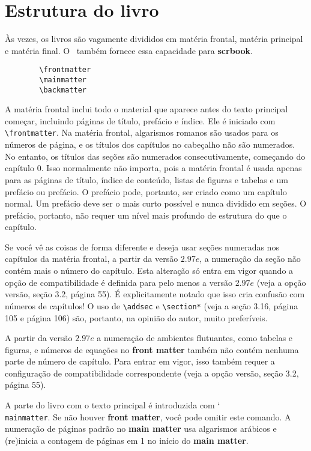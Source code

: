\chapter{Estrutura do livro}
Às vezes, os livros são vagamente divididos em matéria frontal, matéria principal e matéria final. O \KOMAScript\ também fornece essa capacidade para \textbf{scrbook}.
\begin{verbatim}
        \frontmatter
        \mainmatter
        \backmatter
\end{verbatim}

A matéria frontal inclui todo o material que aparece antes do texto principal começar, incluindo páginas de título, prefácio e índice. Ele é iniciado com \verb|\frontmatter|. Na matéria frontal, algarismos romanos são usados para os números de página, e os títulos dos capítulos no cabeçalho não são numerados. No entanto, os títulos das seções são numerados consecutivamente, começando do capítulo 0. Isso normalmente não importa, pois a matéria frontal é usada apenas para as páginas de título, índice de conteúdo, listas de figuras e tabelas e um prefácio ou prefácio. O prefácio pode, portanto, ser criado como um capítulo normal. Um prefácio deve ser o mais curto possível e nunca dividido em seções. O prefácio, portanto, não requer um nível mais profundo de estrutura do que o capítulo.

Se você vê as coisas de forma diferente e deseja usar seções numeradas nos capítulos da matéria frontal, a partir da versão $2.97e$, a numeração da seção não contém mais o número do capítulo. Esta alteração só entra em vigor quando a opção de compatibilidade é definida para pelo menos a versão $2.97e$ (veja a opção versão, seção 3.2, página 55). É explicitamente notado que isso cria confusão com números de capítulos! O uso de \verb|\addsec| e \verb|\section*| (veja a seção 3.16, página 105 e página 106) são, portanto, na opinião do autor, muito preferíveis.

A partir da versão $2.97e$ a numeração de ambientes flutuantes, como tabelas e figuras, e números de equações no \textbf{front matter} também não contém nenhuma parte de número de capítulo. Para entrar em vigor, isso também requer a configuração de compatibilidade correspondente (veja a opção versão, seção 3.2, página 55).

A parte do livro com o texto principal é introduzida com \char`\\\texttt{main\-matter}. Se não houver \textbf{front matter}, você pode omitir este comando. A numeração de páginas padrão no \textbf{main matter} usa algarismos arábicos e (re)inicia a contagem de páginas em 1 no início do \textbf{main matter}.

